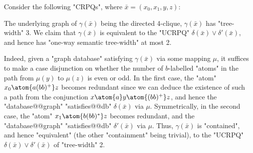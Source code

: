 \begin{example}
    \AP\label{ex:CRPQ-tw3-stw2}
    Consider the following "CRPQs",
    where $\bar x = (x_0,x_1,y,z)$:\leavevmode
    \begin{center}
        \small
    \end{center}
    \noindent
    The underlying graph of $\gamma(\bar x)$ being the directed 4-clique, $\gamma 
    (\bar x)$ has "tree-width" 3. We claim that $\gamma(\bar x)$ is equivalent to the "UCRPQ"
    $\delta(\bar x) \lor \delta'(\bar x)$, and hence has "one-way semantic tree-width" at most 2.

    Indeed, given a "graph database" satisfying $\gamma(\bar x)$ via some mapping $\mu$, 
    it suffices to make a case disjunction on whether the number of $b$-labelled "atoms"
    in the path from
    $\mu(y)$ to $\mu(z)$ is even or odd. In the first case, the "atom" $x_0\atom{a(bb)^+} z$ becomes
    redundant since we can deduce the existence of such a path from the conjunction
    $x \atom{a} y \atom{(bb)^+} z$, and hence the "database@@graph" "satisfies@@db" $\delta(\bar x)$ via $\mu$.
    Symmetrically, in the second case, the "atom" $x_1 \atom{b(bb)^*} z$ becomes redundant,
    and the "database@@graph" "satisfies@@db" $\delta'(\bar x)$ via $\mu$. 
    Thus, $\gamma(\bar x)$
    is "contained", and hence "equivalent" (the other "containment" being trivial), to
    the "UCRPQ" $\delta(\bar x) \lor \delta'(\bar x)$ of "tree-width" 2.
\end{example}


